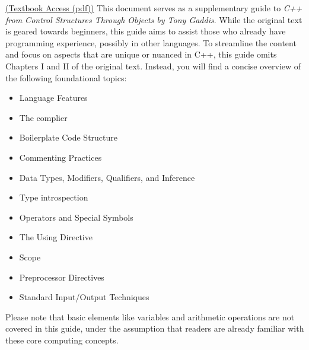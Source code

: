 \documentclass{report}
\begin{document}
    \bigbreak \noindent 
    \href{https://github.com/JiaRuiShao/CPP/blob/master/Starting\%20Out\%20with\%20C\%2B\%2B\%20from\%20Control\%20Structures\%20to\%20Objects\%208\%20Tony\%20Gaddis.pdf}{(Textbook Access (pdf))}
    \bigbreak \noindent 
    This document serves as a supplementary guide to \textit{C++ from Control Structures Through Objects by Tony Gaddis}. While the original text is geared towards beginners, this guide aims to assist those who already have programming experience, possibly in other languages.
    \bigbreak \noindent 
    To streamline the content and focus on aspects that are unique or nuanced in C++, this guide omits Chapters I and II of the original text. Instead, you will find a concise overview of the following foundational topics:
    \begin{itemize}
        \item Language Features
        \item The complier
        \item Boilerplate Code Structure
        \item Commenting Practices
        \item Data Types, Modifiers, Qualifiers, and Inference
        \item Type introspection
        \item Operators and Special Symbols
        \item The Using Directive
        \item Scope 
        \item Preprocessor Directives
        \item Standard Input/Output Techniques
    \end{itemize}
    \bigbreak \noindent
    Please note that basic elements like variables and arithmetic operations are not covered in this guide, under the assumption that readers are already familiar with these core computing concepts.

    
\end{document}
